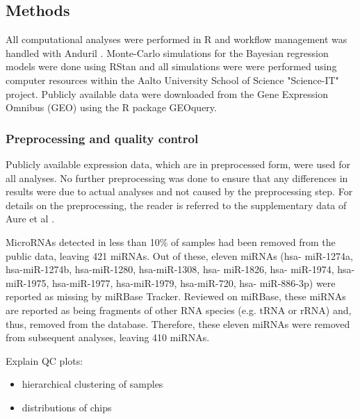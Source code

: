 


\subsection{Methods}

All computational analyses were performed in R \citep{R} and workflow
management was handled with Anduril \citep{OvaskaXXXX}. Monte-Carlo
simulations for the Bayesian regression models were done using RStan
\citep{stan} and all simulations were were performed using computer
resources within the Aalto University School of Science "Science-IT"
project. Publicly available data were downloaded from the
Gene Expression Omnibus (GEO) using the R package GEOquery.




\subsubsection{Preprocessing and quality control}

Publicly available expression data, which are in preprocessed form, were used
for all analyses. No further preprocessing was done to ensure that any
differences in results were due to actual analyses and not caused by the
preprocessing step. For details on the preprocessing, the reader is referred
to the supplementary data of Aure et al \citep{Aure2015}.

MicroRNAs detected in less than 10\% of samples had been removed from the
public data, leaving 421 miRNAs. Out of these, eleven miRNAs (hsa-
miR-1274a, hsa-miR-1274b, hsa-miR-1280, hsa-miR-1308, hsa- miR-1826, hsa-
miR-1974, hsa-miR-1975, hsa-miR-1977, hsa-miR-1979, hsa-miR-720, hsa-
miR-886-3p) were reported as missing by miRBase Tracker. Reviewed on miRBase,
these miRNAs are reported as being fragments of other RNA species (e.g. tRNA
or rRNA) and, thus, removed from the database. Therefore, these eleven miRNAs
were removed from subsequent analyses, leaving 410 miRNAs.

Explain QC plots:
\begin{itemize}
	\item hierarchical clustering of samples
	\item distributions of chips
\end{itemize}

